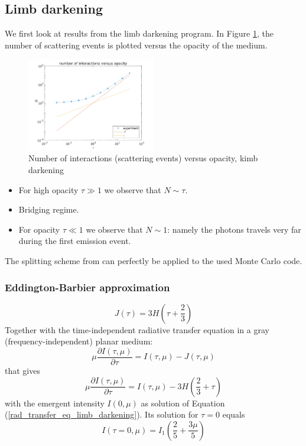 \documentclass[../main/main.tex]{subfiles}
\begin{document}
\newpage
\subsection{Limb darkening} We first look at results from the limb darkening program. In Figure \ref{limb_darkening_N_vs_tau}, the number of scattering events is plotted versus the opacity of the medium. 

	\begin{figure}[!htp]
	\centering
	\includegraphics[width=0.5\textwidth]{../../introductory_exercises/limb_darkening/data/N_vs_opacity.png}
	\caption{Number of interactions (scattering events) versus 	opacity, kimb darkening}
	\label{limb_darkening_N_vs_tau}
	\end{figure}

\begin{itemize}
\item For high opacity $\tau \gg 1$ we observe that $N \sim \tau$. \item Bridging regime.
\item For opacity $\tau \ll 1$ we observe that $N \sim 1$: namely the photons travels very far during the first emission event.
\end{itemize}

The splitting scheme from \cite{Dimarco2018} can perfectly be applied to the used Monte Carlo code.

\subsubsection{Eddington-Barbier approximation} 
\begin{equation}
\boxed{J(\tau) = 3H \left( \tau + \frac{2}{3} \right)}
\label{Eddington_Barbier}
\end{equation}
Together with the time-independent radiative transfer equation in a gray (frequency-independent) planar medium:
\begin{equation}
\mu \frac{\partial I(\tau,\mu)}{\partial \tau} = I(\tau,\mu) - J(\tau,\mu)
\end{equation}
that gives
\begin{equation}
\boxed{\mu \frac{\partial I(\tau,\mu)}{\partial \tau} = I(\tau,\mu) - 3H\left(\frac{2}{3}+\tau \right)}
\label{rad_transfer_eq_limb_darkening}
\end{equation}
with the emergent intensity $I(0,\mu)$ as solution of  Equation (\ref{rad_transfer_eq_limb_darkening}). Its solution for $\tau = 0$ equals 
\begin{equation}
I(\tau = 0,\mu) = I_1 \left( \frac{2}{5} + \frac{3 \mu}{5} \right) 
\end{equation}
\end{document}
